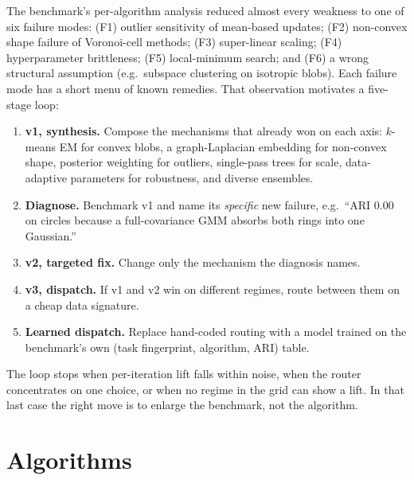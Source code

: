 \documentclass[11pt,a4paper]{article}
\begin{document}
The benchmark's per-algorithm analysis reduced almost every weakness to one of
six failure modes: (F1) outlier sensitivity of mean-based updates; (F2)
non-convex shape failure of Voronoi-cell methods; (F3) super-linear scaling;
(F4) hyperparameter brittleness; (F5) local-minimum search; and (F6) a wrong
structural assumption (e.g.\ subspace clustering on isotropic blobs). Each
failure mode has a short menu of known remedies. That observation motivates a
five-stage loop:
\begin{enumerate}
  \item \textbf{v1, synthesis.} Compose the mechanisms that already won on each
  axis: $k$-means EM for convex blobs, a graph-Laplacian embedding for
  non-convex shape, posterior weighting for outliers, single-pass trees for
  scale, data-adaptive parameters for robustness, and diverse ensembles.
  \item \textbf{Diagnose.} Benchmark v1 and name its \emph{specific} new
  failure, e.g.\ ``ARI 0.00 on circles because a full-covariance GMM absorbs
  both rings into one Gaussian.''
  \item \textbf{v2, targeted fix.} Change only the mechanism the diagnosis
  names.
  \item \textbf{v3, dispatch.} If v1 and v2 win on different regimes, route
  between them on a cheap data signature.
  \item \textbf{Learned dispatch.} Replace hand-coded routing with a model
  trained on the benchmark's own (task fingerprint, algorithm, ARI) table.
\end{enumerate}
The loop stops when per-iteration lift falls within noise, when the router
concentrates on one choice, or when no regime in the grid can show a lift. In
that last case the right move is to enlarge the benchmark, not the algorithm.

\section{Algorithms}\label{sec:algos}
\end{document}
